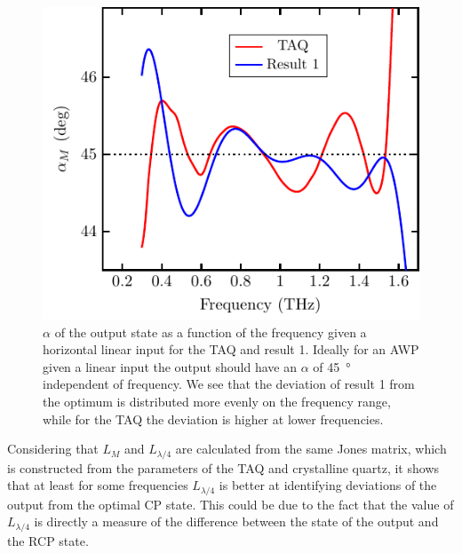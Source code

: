 \begin{figure}[H]
    \centering
    \includegraphics[scale=0.8]{images/results/plots/ceramic/alpha.pdf}
    \caption{$\alpha$ of the output state as a function of the frequency given a horizontal linear input for the TAQ and result 1. Ideally for an AWP given a linear input the output should have an $\alpha$ of \SI{45}{\degree} independent of frequency. We see that the deviation of result 1 from the optimum is distributed more evenly on the frequency range, while for the TAQ the deviation is higher at lower frequencies.}
    \label{fig:cl4_alpha}
\end{figure}

Considering that $L_M$ and $L_{\lambda/4}$ are calculated from the same Jones matrix, which is constructed from the parameters of the TAQ and crystalline quartz, it shows that at least for some frequencies $L_{\lambda/4}$ is better at identifying deviations of the output from the optimal CP state. This could be due to the fact that the value of $L_{\lambda/4}$ is directly a measure of the difference between the state of the output and the RCP state.

